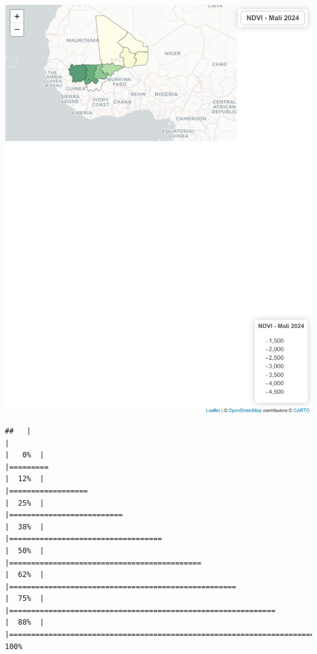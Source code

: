 \documentclass[
]{book}
\begin{document}
\includegraphics{Atlas-Spectral-Sahel_files/figure-latex/ndvi-cartes-3.pdf}

\begin{verbatim}
##   |                                                                              |                                                                      |   0%  |                                                                              |=========                                                             |  12%  |                                                                              |==================                                                    |  25%  |                                                                              |==========================                                            |  38%  |                                                                              |===================================                                   |  50%  |                                                                              |============================================                          |  62%  |                                                                              |====================================================                  |  75%  |                                                                              |=============================================================         |  88%  |                                                                              |======================================================================| 100%
\end{verbatim}
\end{document}
